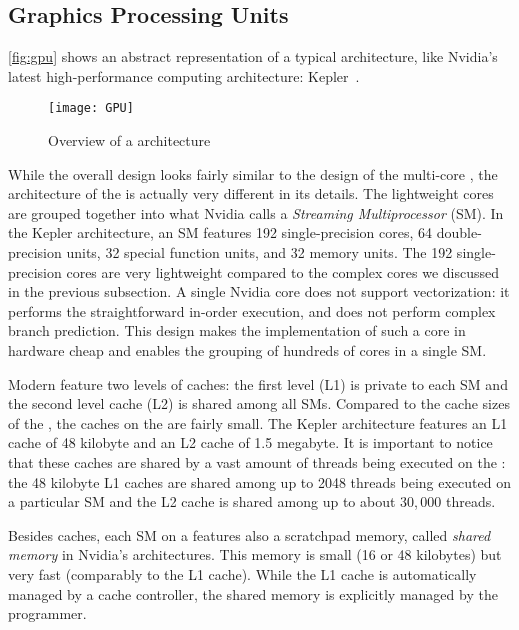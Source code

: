 \subsection[Graphics Processing Units (\GPUs)]{Graphics Processing Units}
\autoref{fig:gpu} shows an abstract representation of a typical \GPU architecture, like Nvidia's latest high-performance computing \GPU architecture: Kepler~\cite{CUDAKepler2012}.
\begin{figure}
  \centering
  \texttt{[image: GPU]}
  \caption{Overview of a \GPU architecture}
  \label{fig:gpu}
\end{figure}
While the overall design looks fairly similar to the design of the multi-core \CPU, the architecture of the \GPU is actually very different in its details.
The lightweight \GPU cores are grouped together into what Nvidia calls a \emph{Streaming Multiprocessor} (SM).
In the Kepler architecture, an SM features 192 single-precision cores, 64 double-precision units, 32 special function units, and 32 memory units.
The 192 single-precision cores are very lightweight compared to the complex \CPU cores we discussed in the previous subsection.
A single Nvidia \GPU core does not support \SIMD vectorization:
it performs the straightforward in-order execution, and does not perform complex branch prediction.
This design makes the implementation of such a core in hardware cheap and enables the grouping of hundreds of cores in a single SM.

Modern \GPUs feature two levels of caches:
the first level (L1) is private to each SM and the second level cache (L2) is shared among all SMs.
Compared to the cache sizes of the \CPU, the caches on the \GPU are fairly small.
The Kepler architecture features an L1 cache of 48 kilobyte and an L2 cache of 1.5 megabyte.
It is important to notice that these caches are shared by a vast amount of threads being executed on the \GPU:
the 48 kilobyte L1 caches are shared among up to 2048 threads being executed on a particular SM and the L2 cache is shared among up to about 30,\,000 threads.

Besides caches, each SM on a \GPU features also a scratchpad memory, called \emph{shared memory} in Nvidia's \GPU architectures.
This memory is small (16 or 48 kilobytes) but very fast (comparably to the L1 cache).
While the L1 cache is automatically managed by a cache controller, the shared memory is explicitly managed by the programmer.

